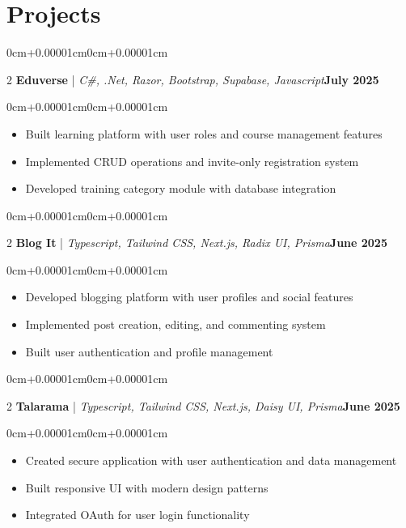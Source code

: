 \documentclass[10pt, letterpaper]{article}
\newenvironment{highlights}{\begin{itemize}[topsep=0.10cm,parsep=0.10cm,partopsep=0pt,itemsep=0pt,leftmargin=0cm+10pt]}{\end{itemize}}
\newenvironment{onecolentry}{\begin{adjustwidth}{0cm+0.00001cm}{0cm+0.00001cm}}{\end{adjustwidth}}
\newenvironment{twocolentry}[2][]{\onecolentry\def\secondColumn{#2}\setcolumnwidth{\fill,5cm}\begin{paracol}{2}}{\switchcolumn \raggedleft \secondColumn\end{paracol}\endonecolentry}
\begin{document}
\section{Projects}
    \begin{twocolentry}{\textbf{July 2025}}
        \textbf{Eduverse} | \textit{C\#, .Net, Razor, Bootstrap, Supabase, Javascript}\end{twocolentry}
    \vspace{0.10cm}
    \begin{onecolentry}
        \begin{highlights}
            \item Built learning platform with user roles and course management features
            \item Implemented CRUD operations and invite-only registration system
            \item Developed training category module with database integration
        \end{highlights}
    \end{onecolentry}
    \vspace{0.15cm}
    \begin{twocolentry}{\textbf{June 2025}}
        \textbf{Blog It} | \textit{Typescript, Tailwind CSS, Next.js, Radix UI, Prisma}\end{twocolentry}
    \vspace{0.10cm}
    \begin{onecolentry}
        \begin{highlights}
            \item Developed blogging platform with user profiles and social features
            \item Implemented post creation, editing, and commenting system
            \item Built user authentication and profile management
        \end{highlights}
    \end{onecolentry}
    \vspace{0.15cm}
    \begin{twocolentry}{\textbf{June 2025}}
        \textbf{Talarama} | \textit{Typescript, Tailwind CSS, Next.js, Daisy UI, Prisma}\end{twocolentry}
    \vspace{0.10cm}
    \begin{onecolentry}
        \begin{highlights}
            \item Created secure application with user authentication and data management
            \item Built responsive UI with modern design patterns
            \item Integrated OAuth for user login functionality
        \end{highlights}
    \end{onecolentry}
    \vspace{0.15cm}
\end{document}
